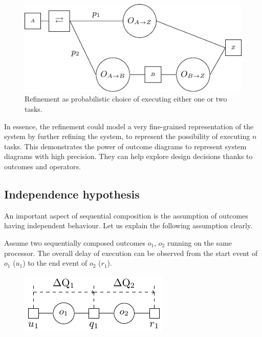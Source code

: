    \begin{figure}[H]
            \begin{center}
                \includegraphics[scale = 1]{tikz/ref_op.pdf}
            \end{center}
            \caption{Refinement as probabilistic choice of executing either one or two tasks.}
            \label{fig:prob_ref}
        \end{figure}
    In essence, the refinement could model a very fine-grained representation of the system by further refining the system, to represent the possibility of executing $n$ tasks. This demonstrates the power of outcome diagrams to represent system diagrams with high precision. They can help explore design decisions thanks to outcomes and operators.

    \subsection{Independence hypothesis}  
        An important aspect of sequential composition is the assumption of outcomes having independent behaviour. Let us explain the following assumption clearly.

        Assume two sequentially composed outcomes $o_1$, $o_2$ running on the same processor. The overall delay of execution can be observed from the start event of $o_1$ ($u_1$) to the end event of $o_2$ ($r_1$). 
        \begin{figure}[H]
            \begin{center}
                \includegraphics[scale=1]{tikz/indep.pdf}
            \end{center}
        \end{figure}
        
